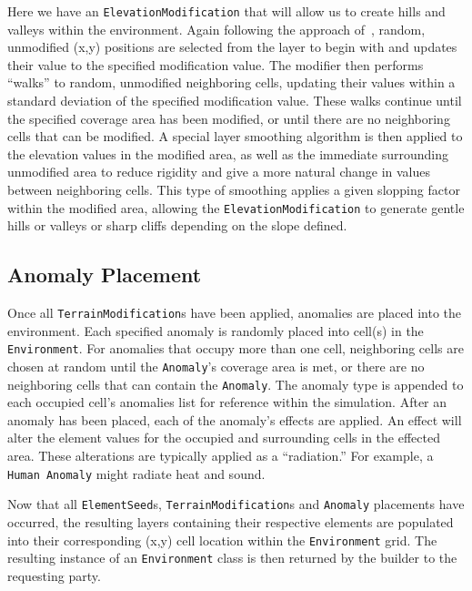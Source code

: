 Here we have an \texttt{ElevationModification} that will allow us to create hills and valleys within the environment.
Again following the approach of~\cite{doran_controlled_2010}, random, unmodified (x,y) positions are selected from the layer to begin with and updates their value to the specified modification value.
The modifier then performs ``walks'' to random, unmodified neighboring cells, updating their values within a standard deviation of the specified modification value.
These walks continue until the specified coverage area has been modified, or until there are no neighboring cells that can be modified.
A special layer smoothing algorithm is then applied to the elevation values in the modified area, as well as the immediate surrounding unmodified area to reduce rigidity and give a more natural change in values between neighboring cells.
This type of smoothing applies a given slopping factor within the modified area, allowing the \texttt{ElevationModification} to generate gentle hills or valleys or sharp cliffs depending on the slope defined.


\subsection{Anomaly Placement} \label{subsec:anomaly_placement}
Once all \texttt{TerrainModification}s have been applied, anomalies are placed into the environment.
Each specified anomaly is randomly placed into cell(s) in the \texttt{Environment}.
For anomalies that occupy more than one cell, neighboring cells are chosen at random until the \texttt{Anomaly}'s coverage area is met, or there are no neighboring cells that can contain the \texttt{Anomaly}.
The anomaly type is appended to each occupied cell's anomalies list for reference within the simulation.
After an anomaly has been placed, each of the anomaly's effects are applied.
An effect will alter the element values for the occupied and surrounding cells in the effected area.
These alterations are typically applied as a ``radiation.''
For example, a \texttt{Human Anomaly} might radiate heat and sound.

Now that all \texttt{ElementSeed}s, \texttt{TerrainModification}s and \texttt{Anomaly} placements have occurred, the resulting layers containing their respective elements are populated into their corresponding (x,y) cell location within the \texttt{Environment} grid.
The resulting instance of an \texttt{Environment} class is then returned by the builder to the requesting party.



